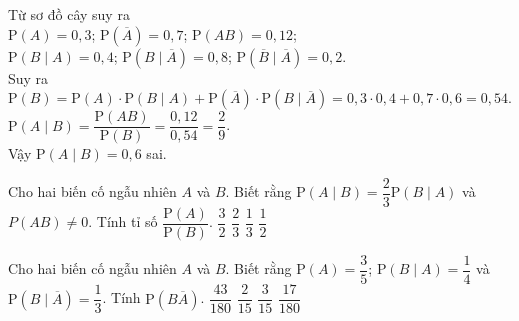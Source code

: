 \begin{ex}
{\begin{center}
\begin{tikzpicture}[scale=0.7,>=stealth, font=\footnotesize, line join=round, line cap=round]
	\end{tikzpicture}
	\end{center}
	Từ sơ đồ cây suy ra\\
	$\mathrm{P}\left(A\right)= 0{,}3$; $\mathrm{P}\left(\overline{A}\right)= 0{,}7$;
	$\mathrm{P}\left(A B\right)= 0{,}12$;\\
	$\mathrm{P}\left(B\mid A\right)= 0{,}4$; $\mathrm{P}\left(B\mid \overline{A}\right)= 0{,}8$;
	$\mathrm{P}\left(\overline{B}\mid \overline{A}\right)=0{,}2$.\\
	Suy ra
	$\mathrm{P}\left(B\right)= \mathrm{P}\left(A\right)\cdot \mathrm{P}(B\mid A)
	+ \mathrm{P}\left(\overline{A}\right)\cdot \mathrm{P}(B\mid \overline{A})
	= 0{,}3\cdot 0{,}4 + 0{,}7\cdot 0{,}6 = 0{,}54 $.\\
	$\mathrm{P}\left(A\mid B\right)= \dfrac{\mathrm{P}\left(AB\right)}{\mathrm{P}\left(B\right)}
	=\dfrac{0{,}12}{0{,}54}=\dfrac{2}{9}$.\\
	Vậy $\mathrm{P}\left(A\mid B\right)=0{,}6$ sai.
	}
\end{ex}
\begin{ex}%
	Cho hai biến cố ngẫu nhiên $A$ và $B$. Biết rằng $\mathrm{P}\left(A\mid B\right)= \dfrac{2}{3} \mathrm{P}\left(B\mid A\right)$ và $P\left(AB\right) \ne 0$. Tính tỉ số $\dfrac{\mathrm{P}\left(A\right)}{\mathrm{P}\left(B\right)}$.
	\choice
	{$\dfrac{3}{2}$}
	{\True $\dfrac{2}{3}$}
	{$\dfrac{1}{3}$}
	{$\dfrac{1}{2}$}
\end{ex}
\begin{ex}%
	Cho hai biến cố ngẫu nhiên $A$ và $B$. Biết rằng $\mathrm{P}\left(A\right)= \dfrac{3}{5}$; $\mathrm{P}\left(B\mid A\right)= \dfrac{1}{4}$ và $\mathrm{P}\left(B\mid \overline{A}\right)= \dfrac{1}{3}$. Tính $\mathrm{P}\left(B\overline{A}\right)$.
	\choice
	{$\dfrac{43}{180}$}
	{\True$\dfrac{2}{15}$}
	{$\dfrac{3}{15}$}
	{$\dfrac{17}{180}$}
\end{ex}
